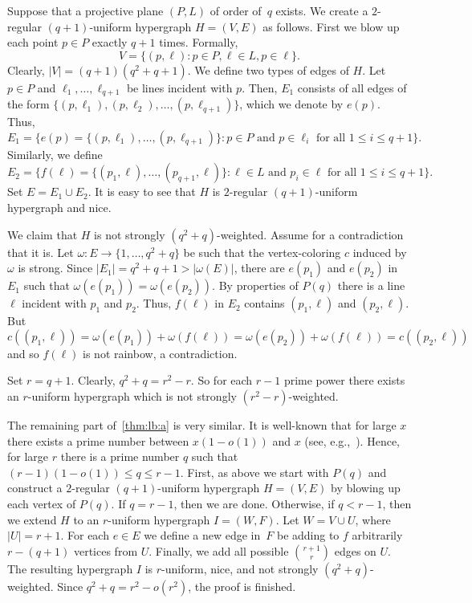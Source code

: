\documentclass[12pt,reqno]{amsart}
\begin{document}
Suppose that a projective plane $(P,L)$ of order of~$q$ exists. We create a $2$-regular $(q+1)$-uniform hypergraph $H=(V,E)$ as follows. First we blow up each point $p\in P$ exactly $q+1$ times. Formally, 
\[
V = \{ (p,\ell) : p\in P, \ell\in L, p\in\ell \}.
\]
Clearly, $|V| = (q+1)(q^2+q+1)$. We define two types of edges of $H$. Let $p\in P$ and $\ell_1,\dots,\ell_{q+1}$ be lines incident with $p$. Then, $E_1$ consists of all edges of the form $\{(p,\ell_1), (p,\ell_2),\dots, (p,\ell_{q+1})\}$, which we denote by $e(p)$. Thus,
\[
E_1 = \{ e(p) = \{(p,\ell_1),\dots, (p,\ell_{q+1})\} : p\in P \text{ and } p \in \ell_i  \text{ for all } 1\le i\le q+1\}.
\]
Similarly, we define
\[
E_2 = \{ f(\ell)=\{(p_1,\ell),\dots,(p_{q+1},\ell)\} : \ell\in L \text{ and } p_i\in \ell \text{ for all } 1\le i\le q+1 \}.
\]
Set $E=E_1\cup E_2$. It is easy to see that $H$ is $2$-regular $(q+1)$-uniform hypergraph and nice.

We claim that $H$ is not strongly $(q^2+q)$-weighted. Assume for a contradiction that it is. Let $\omega:E\to\{1,\dots,q^2+q\}$ be such that the vertex-coloring $c$ induced by $\omega$ is strong. Since $|E_1|=q^2+q+1  > |\omega(E)|$, there are $e(p_1)$ and $e(p_2)$ in $E_1$ such that $\omega(e(p_1)) = \omega(e(p_2))$. By properties of $P(q)$ there is a line $\ell$ incident with $p_1$ and $p_2$. Thus,  $f(\ell)$ in $E_2$  contains $(p_1,\ell)$ and $(p_2,\ell)$. But
\[
c((p_1,\ell)) = \omega(e(p_1)) + \omega(f(\ell)) = \omega(e(p_2)) + \omega(f(\ell)) = c((p_2,\ell))
\]
and so $f(\ell)$ is not rainbow, a contradiction.

Set $r = q+1$. Clearly, $q^2+q = r^2-r$. So for each $r-1$ prime power there exists an $r$-uniform hypergraph which is not strongly  $(r^2-r)$-weighted.

The remaining part of~\ref{thm:lb:a} is very similar. It is well-known that for large $x$ there exists a prime number between $x(1-o(1))$ and $x$ (see, e.g.,~\cite{BHP}). Hence, for large $r$ there is a prime number $q$ such that $(r-1)(1-o(1))\le q\le r-1$. First, as above we start with $P(q)$ and construct a $2$-regular $(q+1)$-uniform hypergraph $H=(V,E)$ by blowing up each vertex of $P(q)$. If $q=r-1$, then we are done. Otherwise, if $q < r-1$, then we extend $H$ to an $r$-uniform hypergraph $I = (W,F)$. Let $W=V\cup U$, where $|U| = r+1$. For each $e\in E$ we define a new edge in~$F$ be adding to $f$ arbitrarily $r-(q+1)$ vertices from $U$. Finally, we add all possible $\binom{r+1}{r}$ edges on $U$. The resulting hypergraph $I$ is $r$-uniform, nice, and not strongly $(q^2+q)$-weighted. Since $q^2+q = r^2-o(r^2)$, the proof is finished.
\end{document}
